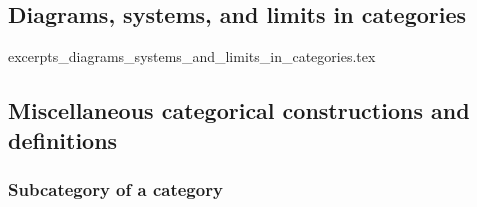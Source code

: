 



\subsection{Diagrams, systems, and limits in categories}

{excerpts_diagrams_systems_and_limits_in_categories.tex}

\subsection{Miscellaneous categorical constructions and definitions}

\subsubsection{Subcategory of a category}








